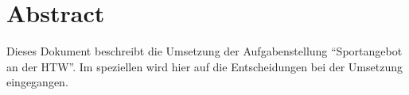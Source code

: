\chapter{Abstract}
Dieses Dokument beschreibt die Umsetzung der Aufgabenstellung "`Sportangebot an der HTW"'. Im speziellen wird hier auf die Entscheidungen bei der Umsetzung eingegangen.